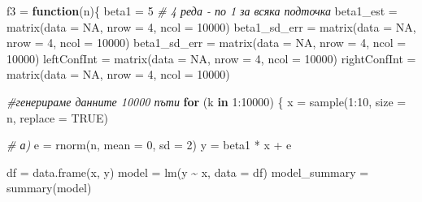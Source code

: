 \documentclass[
]{article}
\newenvironment{Shaded}{\begin{snugshade}}{\end{snugshade}}
\newcommand{\AttributeTok}[1]{\textcolor[rgb]{0.77,0.63,0.00}{#1}}
\newcommand{\CommentTok}[1]{\textcolor[rgb]{0.56,0.35,0.01}{\textit{#1}}}
\newcommand{\ConstantTok}[1]{\textcolor[rgb]{0.00,0.00,0.00}{#1}}
\newcommand{\ControlFlowTok}[1]{\textcolor[rgb]{0.13,0.29,0.53}{\textbf{#1}}}
\newcommand{\DecValTok}[1]{\textcolor[rgb]{0.00,0.00,0.81}{#1}}
\newcommand{\FunctionTok}[1]{\textcolor[rgb]{0.00,0.00,0.00}{#1}}
\newcommand{\NormalTok}[1]{#1}
\newcommand{\OtherTok}[1]{\textcolor[rgb]{0.56,0.35,0.01}{#1}}
\newcommand{\SpecialCharTok}[1]{\textcolor[rgb]{0.00,0.00,0.00}{#1}}
\begin{document}
\begin{Shaded}
\begin{Highlighting}[]
\NormalTok{f3 }\OtherTok{=} \ControlFlowTok{function}\NormalTok{(n)\{}
\NormalTok{  beta1 }\OtherTok{=} \DecValTok{5}
  \CommentTok{\# 4 реда {-} по 1 за всяка подточка}
\NormalTok{  beta1\_est }\OtherTok{=}  \FunctionTok{matrix}\NormalTok{(}\AttributeTok{data =} \ConstantTok{NA}\NormalTok{, }\AttributeTok{nrow =} \DecValTok{4}\NormalTok{, }\AttributeTok{ncol =} \DecValTok{10000}\NormalTok{)}
\NormalTok{  beta1\_sd\_err }\OtherTok{=} \FunctionTok{matrix}\NormalTok{(}\AttributeTok{data =} \ConstantTok{NA}\NormalTok{, }\AttributeTok{nrow =} \DecValTok{4}\NormalTok{, }\AttributeTok{ncol =} \DecValTok{10000}\NormalTok{)}
\NormalTok{  beta1\_sd\_err }\OtherTok{=} \FunctionTok{matrix}\NormalTok{(}\AttributeTok{data =} \ConstantTok{NA}\NormalTok{, }\AttributeTok{nrow =} \DecValTok{4}\NormalTok{, }\AttributeTok{ncol =} \DecValTok{10000}\NormalTok{)}
\NormalTok{  leftConfInt }\OtherTok{=} \FunctionTok{matrix}\NormalTok{(}\AttributeTok{data =} \ConstantTok{NA}\NormalTok{, }\AttributeTok{nrow =} \DecValTok{4}\NormalTok{, }\AttributeTok{ncol =} \DecValTok{10000}\NormalTok{)}
\NormalTok{  rightConfInt }\OtherTok{=} \FunctionTok{matrix}\NormalTok{(}\AttributeTok{data =} \ConstantTok{NA}\NormalTok{, }\AttributeTok{nrow =} \DecValTok{4}\NormalTok{, }\AttributeTok{ncol =} \DecValTok{10000}\NormalTok{)}
  
  \CommentTok{\#генерираме данните 10000 пъти}
  \ControlFlowTok{for}\NormalTok{ (k }\ControlFlowTok{in} \DecValTok{1}\SpecialCharTok{:}\DecValTok{10000}\NormalTok{) \{}
\NormalTok{    x }\OtherTok{=} \FunctionTok{sample}\NormalTok{(}\DecValTok{1}\SpecialCharTok{:}\DecValTok{10}\NormalTok{, }\AttributeTok{size =}\NormalTok{ n, }\AttributeTok{replace =} \ConstantTok{TRUE}\NormalTok{)}
    
    \CommentTok{\# а)}
\NormalTok{    e }\OtherTok{=} \FunctionTok{rnorm}\NormalTok{(n, }\AttributeTok{mean =} \DecValTok{0}\NormalTok{, }\AttributeTok{sd =} \DecValTok{2}\NormalTok{)}
\NormalTok{    y }\OtherTok{=}\NormalTok{ beta1 }\SpecialCharTok{*}\NormalTok{ x }\SpecialCharTok{+}\NormalTok{ e}
    
\NormalTok{    df }\OtherTok{=} \FunctionTok{data.frame}\NormalTok{(x, y)}
\NormalTok{    model }\OtherTok{=} \FunctionTok{lm}\NormalTok{(y }\SpecialCharTok{\textasciitilde{}}\NormalTok{ x, }\AttributeTok{data =}\NormalTok{ df)}
\NormalTok{    model\_summary }\OtherTok{=} \FunctionTok{summary}\NormalTok{(model)}
   

\end{Highlighting}
\end{Shaded}
\end{document}
